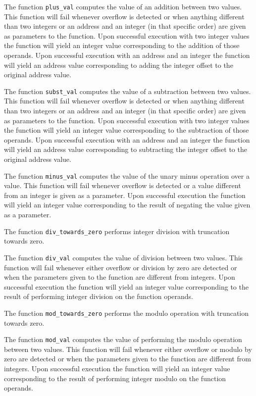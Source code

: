 The function \verb|plus_val| computes the value of an addition between two values.
This function will fail whenever overflow is detected or when anything different than two integers or an address and an integer (in that specific order) are given as parameters to the function.
Upon successful execution with two integer values the function will yield an integer value corresponding to the addition of those operands.
Upon successful execution with an address and an integer the function will yield an address value corresponding to adding the integer offset to the original address value.

The function \verb|subst_val| computes the value of a subtraction between two values.
This function will fail whenever overflow is detected or when anything different than two integers or an address and an integer (in that specific order) are given as parameters to the function.
Upon successful execution with two integer values the function will yield an integer value corresponding to the subtraction of those operands.
Upon successful execution with an address and an integer the function will yield an address value corresponding to subtracting the integer offset to the original address value.

The function \verb|minus_val| computes the value of the unary minus operation over a value.
This function will fail whenever overflow is detected or a value different from an integer is given as a parameter.
Upon successful execution the function will yield an integer value corresponding to the result of negating the value given as a parameter.

The function \verb|div_towards_zero| performs integer division with truncation towards zero.

The function \verb|div_val| computes the value of division between two values.
This function will fail whenever either overflow or division by zero are detected or when the parameters given to the function are different from integers.
Upon successful execution the function will yield an integer value corresponding to the result of performing integer division on the function operands.

The function \verb|mod_towards_zero| performs the modulo operation with truncation towards zero.

The function \verb|mod_val| computes the value of performing the modulo operation between two values.
This function will fail whenever either overflow or modulo by zero are detected or when the parameters given to the function are different from integers.
Upon successful execution the function will yield an integer value corresponding to the result of performing integer modulo on the function operands.

